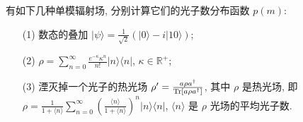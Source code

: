 \documentclass{assignment}
\begin{document}
\begin{prob}[20 分]
    有如下几种单模辐射场, 分别计算它们的光子数分布函数 $p(m)$:
    \begin{itemize}
        \item[(1)] 数态的叠加 $\lvert\psi\rangle=\frac{1}{\sqrt{2}}(\lvert 0\rangle-i\lvert 10\rangle)$;
        \item[(2)] $\rho=\sum_{n=0}^{\infty}\frac{e^{-\kappa}\kappa^n}{n!}\lvert n\rangle\langle n\rvert$, $\kappa\in\mathbb{R}^+$;
        \item[(3)] 湮灭掉一个光子的热光场 $\rho'=\frac{a\rho a^{\dagger}}{\operatorname{Tr}[a\rho a^{\dagger}]}$, 其中 $\rho$ 是热光场, 即\\
        $\rho=\frac{1}{1+\langle n\rangle}\sum_{n=0}^{\infty}\left(\frac{\langle n\rangle}{1+\langle n\rangle}\right)^n\lvert n\rangle\langle n\rvert$, $\langle n\rangle$ 是 $\rho$ 光场的平均光子数.
    \end{itemize}
\end{prob}
\end{document}
